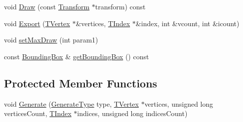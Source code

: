 \begin{DoxyCompactItemize}
\item 
void \hyperlink{class_agmd_1_1_model_aa2c55e47471f726d613e421cf549ab0b}{Draw} (const \hyperlink{class_agmd_maths_1_1_transform}{Transform} $\ast$transform) const 
\item 
void \hyperlink{class_agmd_1_1_model_a539bce37aa4afb469ce09d84851de96b}{Export} (\hyperlink{struct_agmd_1_1_model_1_1_t_vertex}{T\+Vertex} $\ast$\&vertices, \hyperlink{class_agmd_1_1_model_aca4a6ee5402b386a0b9d0aea52c71eaa}{T\+Index} $\ast$\&index, int \&vcount, int \&icount)
\item 
void \hyperlink{class_agmd_1_1_model_a714916578996536faf36001533c5ef2e}{set\+Max\+Draw} (int param1)
\item 
const \hyperlink{class_agmd_1_1_bounding_box}{Bounding\+Box} \& \hyperlink{class_agmd_1_1_model_a0ad5bcf1b7f9947d9e54aa0a960e7628}{get\+Bounding\+Box} () const 
\end{DoxyCompactItemize}
\subsection*{Protected Member Functions}
\begin{DoxyCompactItemize}
\item 
void \hyperlink{class_agmd_1_1_model_a38a209d271ccb493a14af4c2b247fbcf}{Generate} (\hyperlink{namespace_agmd_a6e9a06379d2c12d83e486eb350caa931}{Generate\+Type} type, \hyperlink{struct_agmd_1_1_model_1_1_t_vertex}{T\+Vertex} $\ast$vertices, unsigned long vertices\+Count, \hyperlink{class_agmd_1_1_model_aca4a6ee5402b386a0b9d0aea52c71eaa}{T\+Index} $\ast$indices, unsigned long indices\+Count)
\end{DoxyCompactItemize}
